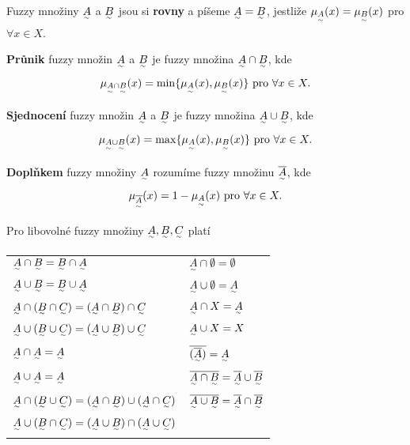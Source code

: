 {\begin{definition}
Fuzzy množiny $\fA$ a $\fB$ jsou si \textbf{rovny} a píšeme $\fA = \fB$, jestliže $\muA(x) = \muB(x)$ pro $\forall x \in X$.
\end{definition}

\begin{definition}
\textbf{Průnik} fuzzy množin $\fA$ a $\fB$ je fuzzy množina $\fA \cap \fB$, kde
\begin{equation*}
\mu_{\fA \cap \fB}(x) = \min \lbrace \muA(x), \muB(x) \rbrace \text{ pro } \forall x \in X.
\end{equation*}
\end{definition}

\begin{definition}
\textbf{Sjednocení} fuzzy množin $\fA$ a $\fB$ je fuzzy množina $\fA \cup \fB$, kde
\begin{equation*}
\mu_{\fA \cup \fB}(x) = \max \lbrace \muA(x), \muB(x) \rbrace \text{ pro } \forall x \in X.
\end{equation*}
\end{definition}

\begin{definition}
\textbf{Doplňkem} fuzzy množiny $\fA$ rozumíme fuzzy množinu $\overline{\fA}$, kde
\begin{equation*}
\mu_{\overline{\fA}}(x) = 1 - \muA(x) \text{ pro } \forall x \in X.
\end{equation*}
\end{definition}

\begin{theorem}
Pro libovolné fuzzy množiny $\fA, \fB, \fC$ platí
\begin{table}[H]
\centering
\begin{tabular}{ll}
$\fA \cap \fB = \fB \cap \fA$                                 & $\fA \cap \emptyset = \emptyset$                             \\
$\fA \cup \fB = \fB \cup \fA$                                 & $\fA \cup \emptyset = \fA$                                   \\
$\fA \cap (\fB \cap \fC) = (\fA \cap \fB) \cap \fC$           & $\fA \cap X = \fA$                                           \\
$\fA \cup (\fB \cup \fC) = (\fA \cup \fB) \cup \fC$           & $\fA \cup X= X$                                              \\
$\fA \cap \fA = \fA$                                          & $\overline{(\overline{\fA})} = \fA$                          \\
$\fA \cup \fA = \fA$                                          & $\overline{\fA \cap \fB}=\overline{\fA} \cup \overline{\fB}$ \\
$\fA \cap (\fB \cup \fC)= (\fA \cap \fB) \cup (\fA \cap \fC)$ & $\overline{\fA \cup \fB}=\overline{\fA} \cap \overline{\fB}$ \\
$\fA \cup (\fB \cap \fC)= (\fA \cup \fB) \cap (\fA \cup \fC)$ &                                                             
\end{tabular}
\end{table}
\end{theorem}


}
